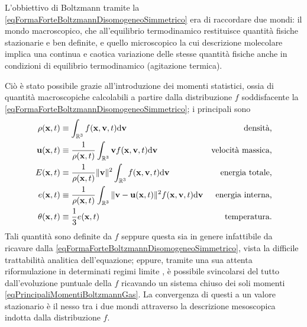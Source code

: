             L'obbiettivo di Boltzmann tramite la \eqref{eqFormaForteBoltzmannDisomogeneoSimmetrico} era di raccordare due mondi: il mondo macroscopico, che all'equilibrio termodinamico restituisce quantità fisiche stazionarie e ben definite, e quello microscopico la cui descrizione molecolare implica una continua e caotica variazione delle stesse quantità fisiche anche in condizioni di equilibrio termodinamico (agitazione termica).

            Ciò è stato possibile grazie all'introduzione dei momenti statistici, ossia di quantità macroscopiche calcolabili a partire dalla distribuzione \(f\) soddisfacente la \eqref{eqFormaForteBoltzmannDisomogeneoSimmetrico}; i principali sono
            \begin{equation}
                \label{eqPrincipaliMomentiBoltzmannGas}
                \begin{aligned}
                    \rho(\mathbf x,t)&\equiv\int_{\mathbb R^3}f(\mathbf x,\mathbf v,t)\mathrm{d}\mathbf v
                    &\text{densità,}\\
                    \mathbf u(\mathbf x,t)&\equiv\frac1{\rho(\mathbf x,t)}\int_{\mathbb R^3}\mathbf vf(\mathbf x,\mathbf v,t)\mathrm{d}\mathbf v
                    &\text{velocità massica,}\\
                    E(\mathbf x,t)&\equiv\frac1{\rho(\mathbf x,t)}\Vert\mathbf v\Vert^2\int_{\mathbb R^3}f(\mathbf x,\mathbf v,t)\mathrm{d}\mathbf v
                    &\text{energia totale,}\\
                    e(\mathbf x,t)&\equiv\frac1{\rho(\mathbf x,t)}\int_{\mathbb R^3}
                    \Vert\mathbf v-\mathbf u(\mathbf x,t)\Vert^2f(\mathbf x,\mathbf v,t)\mathrm{d}\mathbf v
                    &\text{energia interna,}\\
                    \theta(\mathbf x,t)&\equiv\frac13 e(\mathbf x,t)
                    &\text{temperatura.}
                \end{aligned}
            \end{equation}
            Tali quantità sono definite da \(f\) seppure questa sia in genere infattibile da ricavare dalla \eqref{eqFormaForteBoltzmannDisomogeneoSimmetrico}, vista la difficile trattabilità analitica dell'equazione; eppure, tramite una sua attenta riformulazione in determinati regimi limite \cite{Loy2025EKTMAS,PareschiIMS2013}, è possibile svincolarsi del tutto dall'evoluzione puntuale della \(f\) ricavando un sistema chiuso dei soli momenti \eqref{eqPrincipaliMomentiBoltzmannGas}. La convergenza di questi a un valore stazionario è il nesso tra i due mondi attraverso la descrizione mesoscopica indotta dalla distribuzione \(f\). 

